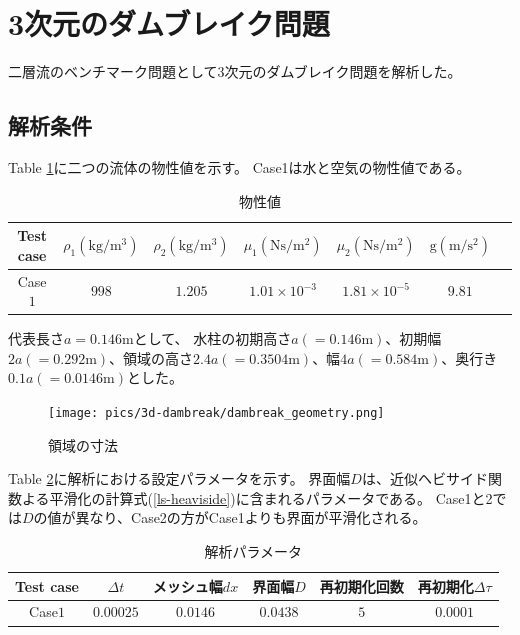 \newpage
\section{3次元のダムブレイク問題}
二層流のベンチマーク問題として3次元のダムブレイク問題を解析した。

\subsection{解析条件}

Table \ref{table:dambreak-material-property}に二つの流体の物性値を示す。
Case1は水と空気の物性値である。
\renewcommand{\arraystretch}{1}
\begin{table}[H]
	\centering
	\caption{物性値}
	\begin{tabular}{ccccccc}
		\hline
		Test case & $\rho_1 (\mathrm{kg/m^3})$ & $\rho_2 (\mathrm{kg/m^3})$ & $\mu_1 (\mathrm{Ns/m^2})$& $\mu_2 (\mathrm{Ns/m^2})$ & $\mathrm{g} (\mathrm{m/s^2})$ \\
		\hline 
		Case$1$ & $998$ & $1.205$   & $1.01\times10^{-3}$ & $1.81\times10^{-5}$ & $9.81$ \\
		\hline         
	\end{tabular}
	\label{table:dambreak-material-property}
\end{table}
\renewcommand{\arraystretch}{1.0}

代表長さ$a=0.146 \mathrm{m}$として、
水柱の初期高さ$a(=0.146\mathrm{m})$、初期幅$2a(=0.292\mathrm{m})$、領域の高さ$2.4a(=0.3504\mathrm{m})$、幅$4a(=0.584\mathrm{m})$、奥行き$0.1a(=0.0146\mathrm{m})$とした。

\begin{figure}[H]
	\centering
	\texttt{[image: pics/3d-dambreak/dambreak\_geometry.png]}
	\caption{領域の寸法\cite{Koshizuka1996}}
	\label{fig:3d-dambreak-geometry}
\end{figure}


Table \ref{table:dambreak-parameter}に解析における設定パラメータを示す。
界面幅$D$は、近似ヘビサイド関数よる平滑化の計算式(\ref{ls-heaviside})に含まれるパラメータである。
Case1と2では$D$の値が異なり、Case2の方がCase1よりも界面が平滑化される。
\renewcommand{\arraystretch}{1}
\begin{table}[H]
	\centering
	\caption{解析パラメータ}
	\begin{tabular}{cccccc}
		\hline
		Test case & $\Delta t$ & メッシュ幅$dx$ & 界面幅$D$ & 再初期化回数 & 再初期化$\Delta \tau$\\
		\hline 
		Case$1$ & $0.00025$ & $0.0146$ & $0.0438$ & $5$ & $0.0001$\\
		\hline         
	\end{tabular}
	\label{table:dambreak-parameter}
\end{table}
\renewcommand{\arraystretch}{1.0}

